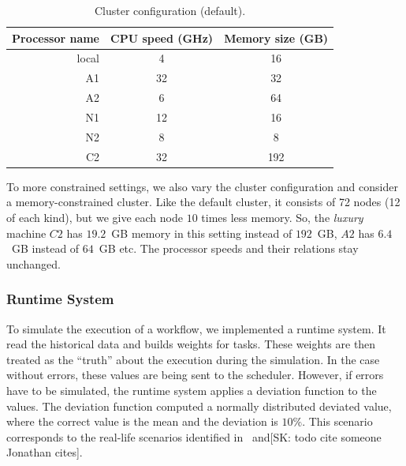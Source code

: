 \documentclass[conference]{IEEEtran}
\newcommand{\skug}[1]{{\color{blue}[SK: #1]}}
\begin{document}
    \begin{table}[htb]
        \begin{center}
            \begin{tabular}{rcc}
                \toprule
                Processor name %
                &  CPU speed (GHz)  &Memory size (GB) \\
                \midrule
                local                    & 4                    & 16     \\
                A1                      & 32                   & 32     \\
                A2                      & 6                    & 64     \\
                N1                      & 12                   & 16     \\
                N2                      & 8                    & 8      \\
                C2                      & 32                   & 192    \\
                \bottomrule
            \end{tabular}
        \end{center}
        \caption{Cluster configuration (default).}
        \label{tab:procs}
    \end{table}

    To more constrained settings, we also vary the cluster configuration and consider
    a memory-constrained cluster.
    Like the default cluster, it consists of 72 nodes (12 of each kind), but we
    give each node $10$ times less memory.
    So, the {\em luxury} machine $C2$ has $19.2$~GB memory in this setting instead of $192$~GB, $A2$ has $6.4$~GB instead
    of $64$~GB etc.
    The processor speeds and their relations stay unchanged.

    \subsubsection{Runtime System}

    To simulate the execution of a workflow, we implemented a runtime system.
    It read the historical data and builds weights for tasks.
    These weights are then treated as the ``truth'' about the execution during the simulation.
    In the case without errors, these values are being sent to the scheduler.
    However, if errors have to be simulated, the runtime system applies a deviation function to the values.
    The deviation function computed a normally distributed deviated value, where the correct value is the mean and the deviation
    is $10\%$.
    This scenario corresponds to the real-life scenarios identified in~\cite{lotaru} and\skug{todo cite someone Jonathan cites}.
\end{document}

